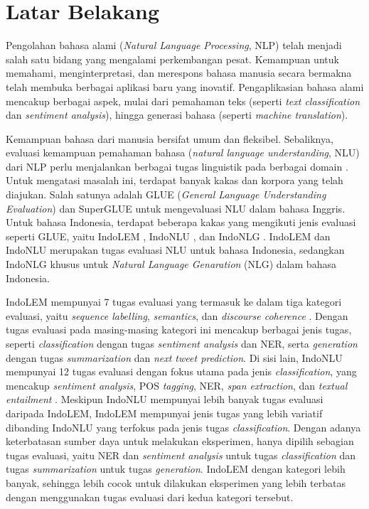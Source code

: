 \section{Latar Belakang}
\label{sec:latar-belakang}

Pengolahan bahasa alami (\textit{Natural Language Processing}, NLP) telah menjadi salah satu bidang yang mengalami perkembangan pesat. Kemampuan untuk memahami, menginterpretasi, dan merespons bahasa manusia secara bermakna telah membuka berbagai aplikasi baru yang inovatif. Pengaplikasian bahasa alami mencakup berbagai aspek, mulai dari pemahaman teks (seperti \textit{text classification} dan \textit{sentiment analysis}), hingga generasi bahasa (seperti \textit{machine translation}).

Kemampuan bahasa dari manusia bersifat umum dan fleksibel. Sebaliknya, evaluasi kemampuan pemahaman bahasa (\textit{natural language understanding}, NLU) dari NLP perlu menjalankan berbagai tugas linguistik pada berbagai domain \parencite{glue}. Untuk mengatasi masalah ini, terdapat banyak kakas dan korpora yang telah diajukan. Salah satunya adalah GLUE (\textit{General Language Understanding Evaluation}) \parencite{glue} dan SuperGLUE \parencite{superglue} untuk mengevaluasi NLU dalam bahasa Inggris. Untuk bahasa Indonesia, terdapat beberapa kakas yang mengikuti jenis evaluasi seperti GLUE, yaitu IndoLEM \parencite{indolem}, IndoNLU \parencite{indonlu}, dan IndoNLG \parencite{indonlg}. IndoLEM dan IndoNLU merupakan tugas evaluasi NLU untuk bahasa Indonesia, sedangkan IndoNLG khusus untuk \textit{Natural Language Genaration} (NLG) dalam bahasa Indonesia.

IndoLEM mempunyai 7 tugas evaluasi yang termasuk ke dalam tiga kategori evaluasi, yaitu \textit{sequence labelling}, \textit{semantics}, dan \textit{discourse coherence} \parencite{indolem}. Dengan tugas evaluasi pada masing-masing kategori ini mencakup berbagai jenis tugas, seperti \textit{classification} dengan tugas \textit{sentiment analysis} dan NER, serta \textit{generation} dengan tugas \textit{summarization} dan \textit{next tweet prediction}. Di sisi lain, IndoNLU mempunyai 12 tugas evaluasi dengan fokus utama pada jenis \textit{classification}, yang mencakup \textit{sentiment analysis}, POS \textit{tagging}, NER, \textit{span extraction}, dan \textit{textual entailment} \parencite{indonlu}. Meskipun IndoNLU mempunyai lebih banyak tugas evaluasi daripada IndoLEM, IndoLEM mempunyai jenis tugas yang lebih variatif dibanding IndoNLU yang terfokus pada jenis tugas \textit{classification}. Dengan adanya keterbatasan sumber daya untuk melakukan eksperimen, hanya dipilih sebagian tugas evaluasi, yaitu NER dan \textit{sentiment analysis} untuk tugas \textit{classification} dan tugas \textit{summarization} untuk tugas \textit{generation}. IndoLEM dengan kategori lebih banyak, sehingga lebih cocok untuk dilakukan eksperimen yang lebih terbatas dengan menggunakan tugas evaluasi dari kedua kategori tersebut.

